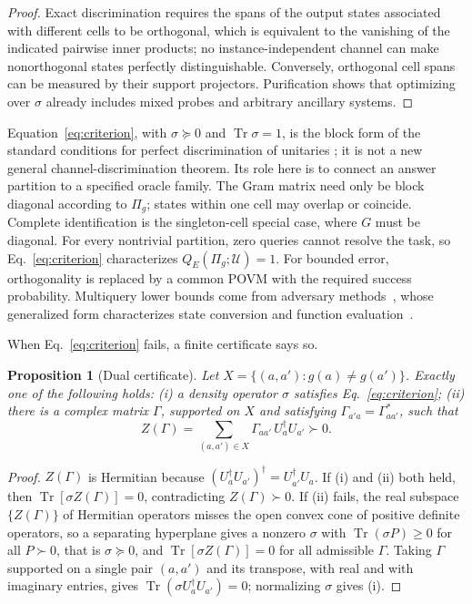 \documentclass[
  aps,
  pra,
  reprint,
  nofootinbib
]{revtex4-2}
\newtheorem{proposition}{Proposition}
\begin{document}
\begin{proof}
Exact discrimination requires the spans of the output states associated with
different cells to be orthogonal, which is equivalent to the vanishing of the
indicated pairwise inner products; no instance-independent channel can make
nonorthogonal states perfectly distinguishable. Conversely, orthogonal cell
spans can be measured by their support projectors. Purification shows that
optimizing over \(\sigma\) already includes mixed probes and arbitrary
ancillary systems.
\end{proof}

Equation~\eqref{eq:criterion}, with \(\sigma\succeq0\) and
\(\operatorname{Tr}\sigma=1\), is the block form of the standard conditions for
perfect discrimination of unitaries
\cite{Acin2001UnitaryDiscrimination,DuanFengYing2009}; it is not a new general
channel-discrimination theorem. Its role here is to connect an answer
partition to a specified oracle family. The Gram matrix need only be block
diagonal according to \(\Pi_g\); states within one cell may overlap or
coincide. Complete identification is the singleton-cell special case, where
\(G\) must be diagonal. For every nontrivial partition, zero queries cannot
resolve the task, so Eq.~\eqref{eq:criterion} characterizes
\(Q_E(\Pi_g;\mathcal U)=1\). For bounded error, orthogonality is replaced by a
common POVM with the required success probability. Multiquery lower bounds
come from adversary methods~\cite{Ambainis2002Adversary}, whose generalized
form characterizes state conversion and function
evaluation~\cite{LeeEtAl2011StateConversion,Reichardt2014SpanPrograms}.

When Eq.~\eqref{eq:criterion} fails, a finite certificate says so.

\begin{proposition}[Dual certificate]\label{prop:dual}
Let \(X=\{(a,a'):g(a)\neq g(a')\}\). Exactly one of the following holds:
(i) a density operator \(\sigma\) satisfies Eq.~\eqref{eq:criterion};
(ii) there is a complex matrix \(\Gamma\), supported on \(X\) and satisfying
\(\Gamma_{a'a}=\Gamma_{aa'}^*\), such that
\begin{equation}
 Z(\Gamma)=\sum_{(a,a')\in X}\Gamma_{aa'}\,U_a^\dagger U_{a'}\succ0 .
 \label{eq:dual-witness}
\end{equation}
\end{proposition}

\begin{proof}
\(Z(\Gamma)\) is Hermitian because \((U_a^\dagger U_{a'})^\dagger=
U_{a'}^\dagger U_a\). If (i) and (ii) both held, then
\(\operatorname{Tr}[\sigma Z(\Gamma)]=0\), contradicting \(Z(\Gamma)\succ0\).
If (ii) fails, the real subspace \(\{Z(\Gamma)\}\) of Hermitian operators misses
the open convex cone of positive definite operators, so a separating
hyperplane gives a nonzero \(\sigma\) with \(\operatorname{Tr}(\sigma P)\ge0\)
for all \(P\succ0\), that is \(\sigma\succeq0\), and
\(\operatorname{Tr}[\sigma Z(\Gamma)]=0\) for all admissible \(\Gamma\). Taking
\(\Gamma\) supported on a single pair \((a,a')\) and its transpose, with real
and with imaginary entries, gives
\(\operatorname{Tr}(\sigma U_a^\dagger U_{a'})=0\); normalizing \(\sigma\) gives
(i).
\end{proof}
\end{document}
